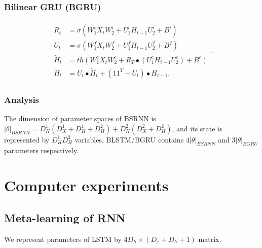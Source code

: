 \documentclass[a4paper,11pt]{article}
\begin{document}
\subsubsection{Bilinear GRU (BGRU)} 
\begin{align}
\begin{split}\nonumber
R_{t} &=\sigma(W_{1}^{i}X_{t}W_{2}^{i} + U_{1}^{i}H_{t-1}U_{2}^{i}  +  B^{i})\\
U_{t} &=\sigma(W_{1}^{f}X_{t}W_{2}^{f} + U_{1}^{f}H_{t-1}U_{2}^{f}  +  B^{f})\\
\tilde{H}_{t} &= th(W_{1}^{c}X_{t}W_{2}^{c} + R_{T} \bullet (U_{1}^{c}H_{t-1}U_{2}^{c})  +  B^{c})\\
H_{t} &= U_{t}\bullet \tilde{H}_{t} + (11^{T} - U_{t})\bullet H_{t-1},
\end{split}.
\end{align}

\subsubsection{Analysis}

The dimension of parameter spaces of BSRNN is $|\theta|_{BSRNN} = D_{H}^{1} (D_{X}^{1} + D_{H}^{1} + D_{H}^{2}) + D_{H}^{2} (D_{X}^{2} + D_{H}^{2})
$, and its state is represented by $D_{H}^{1} D_{H}^{2}$ variables. BLSTM/BGRU contains $4|\theta|_{BSRNN}$ and $3|\theta|_{BGRU}$ parameters respectively.


\section{Computer experiments}

\subsection{Meta-learning of RNN}

We represent parameters of LSTM by $4D_{h} \times (D_{x} + D_{h} + 1)$ matrix.
\end{document}
